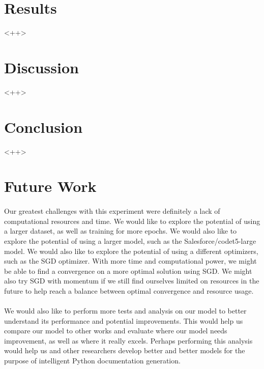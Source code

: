 \documentclass[12pt]{article}
\begin{document}
	\section{Results}
	<++>

	\section{Discussion}
	<++>

	\section{Conclusion}
	<++>

	\section{Future Work}
	\paragraph{} Our greatest challenges with this experiment were definitely a lack of computational resources and time. We would like to explore the potential of using a larger dataset, as well as training for more epochs. We would also like to explore the potential of using a larger model, such as the Salesforce/codet5-large model. We would also like to explore the potential of using a different optimizers, such as the SGD optimizer. With more time and computational power, we might be able to find a convergence on a more optimal solution using SGD. We might also try SGD with momentum if we still find ourselves limited on resources in the future to help reach a balance between optimal convergence and resource usage.
	\paragraph{} We would also like to perform more tests and analysis on our model to better understand its performance and potential improvements. This would help us compare our model to other works and evaluate where our model needs improvement, as well as where it really excels. Perhaps performing this analysis would help us and other researchers develop better and better models for the purpose of intelligent Python documentation generation.

	\pagebreak
	
	
\end{document}
